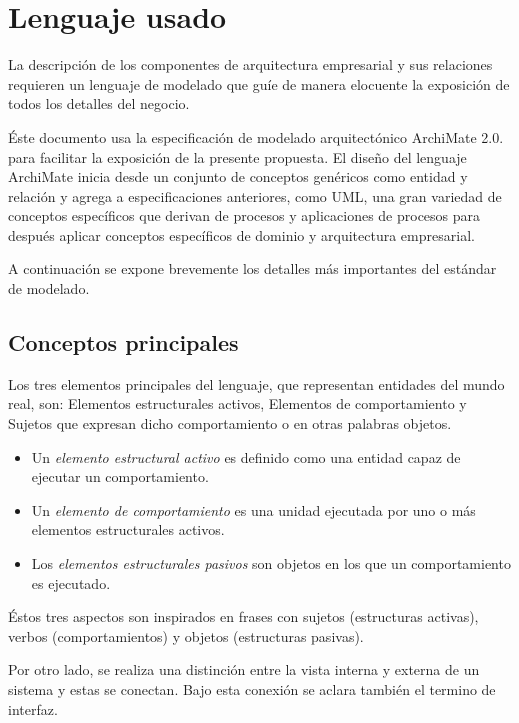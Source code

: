 
\chapter{Lenguaje usado}

La descripción de los componentes de arquitectura empresarial y sus relaciones requieren un lenguaje de modelado que guíe de manera elocuente la exposición de todos los detalles del negocio.

Éste documento usa la especificación de modelado arquitectónico ArchiMate 2.0. \cite{iacob2012archimate} para facilitar la exposición de la presente propuesta. El diseño del lenguaje ArchiMate inicia desde un conjunto de conceptos genéricos como entidad y relación y agrega a especificaciones anteriores, como UML, una gran variedad de conceptos específicos que derivan de procesos y aplicaciones de procesos para después aplicar conceptos específicos de dominio y arquitectura empresarial. 

A continuación se expone brevemente los detalles más importantes del estándar de modelado.

\section{Conceptos principales}

Los tres elementos principales del lenguaje, que representan entidades del mundo real, son: Elementos estructurales activos, Elementos de comportamiento y Sujetos que expresan dicho comportamiento o en otras palabras objetos.

\begin{itemize}
    \item Un \textit{elemento estructural activo} es definido como una entidad capaz de ejecutar un comportamiento.
    \item Un \textit{elemento de comportamiento} es una unidad ejecutada por uno o más elementos estructurales activos.
    \item Los \textit{elementos estructurales pasivos} son objetos en los que un comportamiento es ejecutado.
\end{itemize}

Éstos tres aspectos son inspirados en frases con sujetos (estructuras activas), verbos (comportamientos) y objetos (estructuras pasivas).

Por otro lado, se realiza una distinción entre la vista interna y externa de un sistema y estas se conectan. Bajo esta conexión se aclara también el termino de interfaz.

